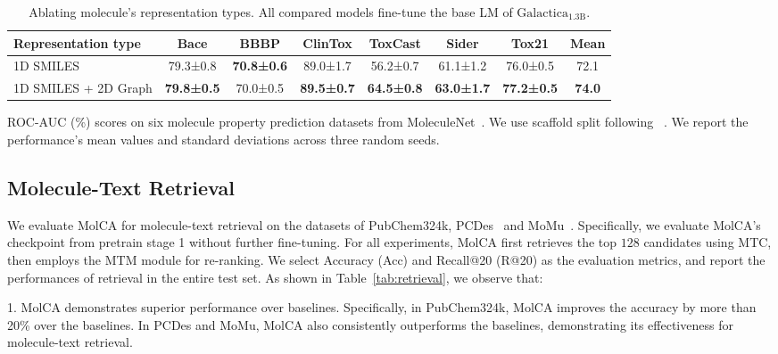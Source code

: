 \documentclass[11pt]{article}
\begin{document}
\begin{table*}[t]
\begin{subtable}[t]{\textwidth}
\end{subtable}
\begin{subtable}[t]{\textwidth}
\centering
\small
\begin{tabular}{lcccccc|c} \toprule
Representation type  & Bace              & BBBP              & ClinTox           & ToxCast           & Sider             & Tox21             & Mean          \\\midrule
1D SMILES            & 79.3±0.8          & \textbf{70.8±0.6} & 89.0±1.7          & 56.2±0.7          & 61.1±1.2          & 76.0±0.5          & 72.1          \\
1D SMILES + 2D Graph & \textbf{79.8±0.5} & 70.0±0.5          & \textbf{89.5±0.7} & \textbf{64.5±0.8} & \textbf{63.0±1.7} & \textbf{77.2±0.5} & \textbf{74.0} \\\bottomrule
\end{tabular}
\caption{ROC-AUC (\%) scores on six molecule property prediction datasets from MoleculeNet~\cite{MoleculeNet}. We use scaffold split following ~\cite{pretrain_gnn}. We report the performance's mean values and standard deviations across three random seeds.}
\end{subtable}
\caption{Ablating molecule's representation types. All compared models fine-tune the base LM of $\text{Galactica}_{\text{1.3B}}$.}
\label{tab:ablation}
\end{table*}



\subsection{Molecule-Text Retrieval}
\label{sec:retrieval}
We evaluate MolCA for molecule-text retrieval on the datasets of PubChem324k, PCDes~\cite{KVPLM} and MoMu~\cite{MoMu}. Specifically, we evaluate MolCA's checkpoint from pretrain stage 1 without further fine-tuning. For all experiments, MolCA first retrieves the top $128$ candidates using MTC, then employs the MTM module for re-ranking. 
We select Accuracy (Acc) and Recall@20 (R@20) as the evaluation metrics, and report the performances of retrieval in the entire test set. As shown in Table~\ref{tab:retrieval}, we observe that:

1. MolCA demonstrates superior performance over baselines. Specifically, in PubChem324k, MolCA improves the accuracy by more than 20\% over the baselines. 
In PCDes and MoMu, MolCA also consistently outperforms the baselines, demonstrating its effectiveness for molecule-text retrieval.
\end{document}

